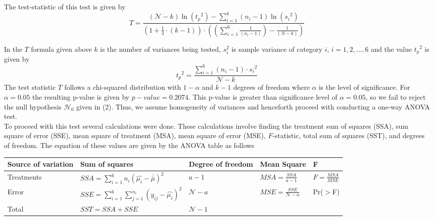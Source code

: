 \documentclass{article}
\begin{document}
The test-statistic of this test is given by $$T=\frac{(\mathcal{N}-k) \ln{({t_p}^2)}-\sum_{i=1}^{6} (n_i-1)\ln{({s_i}^2)}}{(1+\frac{1}{3}\cdot( k-1))\cdot ((\sum_{i=1}^6 \frac{1}{(n_i-1)})-\frac{1}{(N-k)})}$$ 

In the $T$ formula given above $k$ is the number of variances being tested, $s_i^2$ is sample variance of category $i$, $i=1,2,...,6$ and the value ${t_p}^2$ is given by $${t_p}^2=\frac{\sum_{i=1}^{6} (n_i-1) \cdot {s_i}^2}{\mathcal{N}-k}$$
The test statistic $T$ follows a chi-squared distribution with $1-\alpha$ and $k-1$ degrees of freedom where $\alpha$ is the level of significance. For $\alpha=0.05$ the resulting p-value is given by $p-value=0.2074$. This p-value is greater than significance level of $\alpha= 0.05$, so we fail to reject the null hypothesis $\mathcal{H}_0$ given in (2). Thus, we assume homogeneity of variances and henceforth proceed with conducting a one-way ANOVA test. \\


To proceed with this test several calculations were done. These calculations involve finding the treatment sum of squares (SSA), sum square of error (SSE), mean square of treatment (MSA), mean square of error (MSE), $F$-statistic, total sum of squares (SST), and degrees of freedom. The equation of these values are given by the ANOVA table as follows


\begin{center}
\begin{table}[!ht]
\small
\begin{tabular}{ p{2cm}|p{4.45cm}|p{1.6cm}|p{2.2cm}|p{1.65cm} }
 \hline
 Source of variation & Sum of squares &\small Degree of freedom & Mean Square& F \\
\hline 
\vspace{0.00025cm} Treatments &\vspace{0.00025cm} $SSA=\sum_{i=1}^6 n_i {(\widehat{\mu_i}-\bar{\bar{\mu}})}^2$& \vspace{0.00025cm} $a-1$ &  \vspace{0.00025cm} \small $MSA=\frac{SSA}{a-1}$&  \vspace{0.00025cm} $F=\frac{MSA}{MSE}$\\ [2ex]
\hline
\vspace{0.00025cm} Error & \vspace{0.00025cm} $SSE=\sum_{i=1}^{6} \sum_{j=1}^{n_i} {(y_{ij}-\widehat{\mu_i})}^2$ & \vspace{0.00025cm}$\mathcal{N}-a$ &  \vspace{0.00025cm} $MSE=\frac{SSE}{\mathcal{N}-a}$ & Pr($>$F) \\[2ex]

\hline
\vspace{0.00025cm} Total & \vspace{0.00025cm}$SST=SSA+SSE$  &\vspace{0.00025cm} $\mathcal{N}-1$ &  & \\ [2ex]
\hline

\end{tabular}
\end{table}
\end{center}
\end{document}
